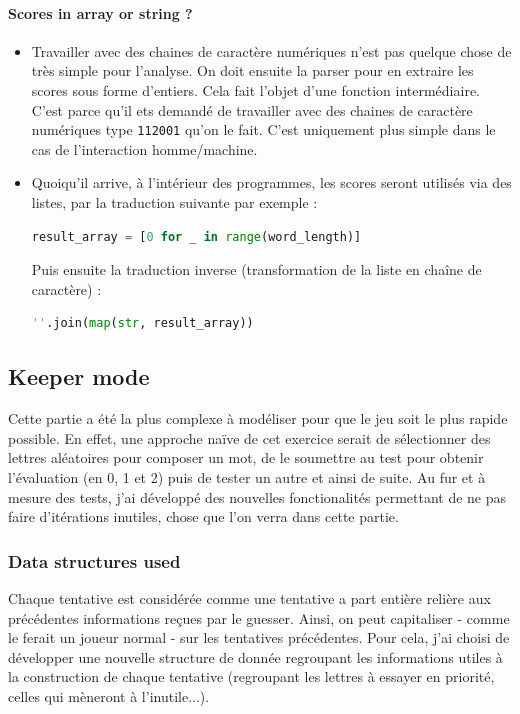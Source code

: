 \documentclass[10pt,a4paper,hidelinks]{article}
\begin{document}
\paragraph{Scores in array or string ?}
\begin{itemize}
    \item Travailler avec des chaines de caractère numériques n'est pas quelque chose de très simple pour l'analyse. On doit ensuite la parser pour en extraire les scores sous forme d'entiers. Cela fait l'objet d'une fonction intermédiaire. C'est parce qu'il ets demandé de travailler avec des chaines de caractère numériques type \verb|112001| qu'on le fait. C'est uniquement plus simple dans le cas de l'interaction homme/machine.
    \item Quoiqu'il arrive, à l'intérieur des programmes, les scores seront utilisés via des listes, par la traduction suivante par exemple :
\begin{lstlisting}[language=Python]
result_array = [0 for _ in range(word_length)]
\end{lstlisting}
        Puis ensuite la traduction inverse (transformation de la liste en chaîne de caractère) :
\begin{lstlisting}[language=Python]
''.join(map(str, result_array))
\end{lstlisting}
\end{itemize}

\subsection{Keeper mode}
Cette partie a été la plus complexe à modéliser pour que le jeu soit le plus rapide possible. En effet, une approche naïve de cet exercice serait de sélectionner des lettres aléatoires pour composer un mot, de le soumettre au test pour obtenir l'évaluation (en 0, 1 et 2) puis de tester un autre et ainsi de suite. Au fur et à mesure des tests, j'ai développé des nouvelles fonctionalités permettant de ne pas faire d'itérations inutiles, chose que l'on verra dans cette partie.

\subsubsection{Data structures used}
Chaque tentative est considérée comme une tentative a part entière relière aux précédentes informations reçues par le guesser. Ainsi, on peut capitaliser - comme le ferait un joueur normal - sur les tentatives précédentes. Pour cela, j'ai choisi de développer une nouvelle structure de donnée regroupant les informations utiles à la construction de chaque tentative (regroupant les lettres à essayer en priorité, celles qui mèneront à l'inutile...).
\end{document}
